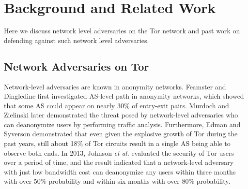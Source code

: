 \section{Background and Related Work}
Here we discuss network level adversaries on the Tor network and past work on defending against such network level adversaries. 

\subsection{Network Adversaries on Tor}
%
Network-level adversaries are known in anonymity networks. Feamster and Dingledine \cite{feamster2004location} first investigated AS-level path in anonymity networks, which showed that some AS could appear on nearly 30\% of entry-exit pairs. Murdoch and Zielinski \cite{murdoch2007sampled} later demonstrated the threat posed by network-level adversaries who can deanonymize users by performing traffic analysis. Furthermore, Edman and Syverson \cite{edman2009awareness} demonstrated that even given the explosive growth of Tor during the past years, still about 18\% of Tor circuits result in a single AS being able to observe both ends. In 2013, Johnson \emph{et al.} \cite{johnson2013users} evaluated the security of Tor users over a period of time, and the result indicated that a network-level adversary with just low bandwidth cost can deanonymize any users within three months with over 50\% probability and within six months with over 80\% probability.

